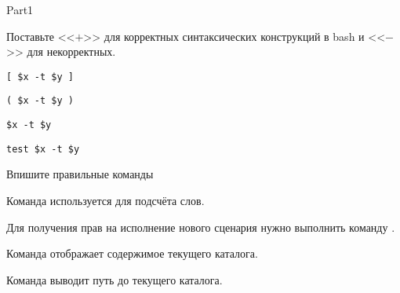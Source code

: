 \documentclass[12pt,a4paper]{article}
\begin{document}
\begin{exam}[Часть I.]{Part1}
\begin{problem*}[6]
Поставьте <<$+$>> для корректных синтаксических конструкций в bash и <<$-$>>
для некорректных.
\fillinWidth{} %
\begin{parts}
    \item \TF{+} \texttt{[ \$x -t \$y ]}
    \item \TF{--} \texttt{( \$x -t \$y )}
    \item \TF{--} \texttt{\$x -t \$y}
    \item \TF{+} \texttt{test \$x -t \$y}
\end{parts}
\end{problem*}

\begin{problem*}[\auto]
Впишите правильные команды
\fillinWidth{} %
\begin{parts}
    \item {} Команда  используется для подсчёта слов.
    \item {} Для получения прав на исполнение нового сценария нужно выполнить команду .
    \item {} Команда  отображает содержимое текущего каталога.
    \item {} Команда  выводит путь до текущего каталога.
\end{parts}
\end{problem*}

\end{exam}
\end{document}
